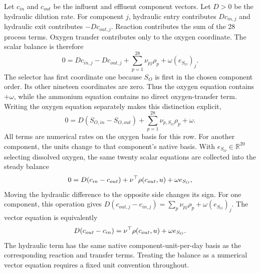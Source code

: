 Let $c_{in}$ and $c_{out}$ be the influent and effluent component vectors. Let $D>0$ be the hydraulic dilution rate. For component $j$, hydraulic entry contributes $Dc_{in,j}$ and hydraulic exit contributes $-Dc_{out,j}$. Reaction contributes the sum of the 28 process terms. Oxygen transfer contributes only to the oxygen coordinate. The scalar balance is therefore
\[
0=Dc_{in,j}-Dc_{out,j}
+\sum_{p=1}^{28}\nu_{pj}\rho_p+\omega(e_{S_O})_j.
\]
The selector has first coordinate one because $S_O$ is first in the chosen component order. Its other nineteen coordinates are zero. Thus the oxygen equation contains $+\omega$, while the ammonium equation contains no direct oxygen-transfer term. Writing the oxygen equation separately makes this distinction explicit,
\[
0=D(S_{O,in}-S_{O,out})+\sum_{p=1}^{28}\nu_{p,S_O}\rho_p+\omega.
\]
All terms are numerical rates on the oxygen basis for this row. For another component, the units change to that component's native basis. With $e_{S_O}\in\mathbb{R}^{20}$ selecting dissolved oxygen, the same twenty scalar equations are collected into the steady balance
\begin{equation}
\equationname{Steady-state reactor component equation}
0=D(c_{in}-c_{out})+\nu^\top\rho(c_{out},u)+\omega e_{S_O},
\label{eq:reactor_steady_balance}
\end{equation}
Moving the hydraulic difference to the opposite side changes its sign. For one component, this operation gives $D(c_{out,j}-c_{in,j})=\sum_p\nu_{pj}\rho_p+\omega(e_{S_O})_j$. The vector equation is equivalently
\begin{equation}
\equationname{Effluent change expressed through reaction and oxygen transfer}
D(c_{out}-c_{in})=\nu^\top\rho(c_{out},u)+\omega e_{S_O}.
\label{eq:reactor_steady_difference}
\end{equation}
The hydraulic term has the same native component-unit-per-day basis as the corresponding reaction and transfer terms. Treating the balance as a numerical vector equation requires a fixed unit convention throughout.

